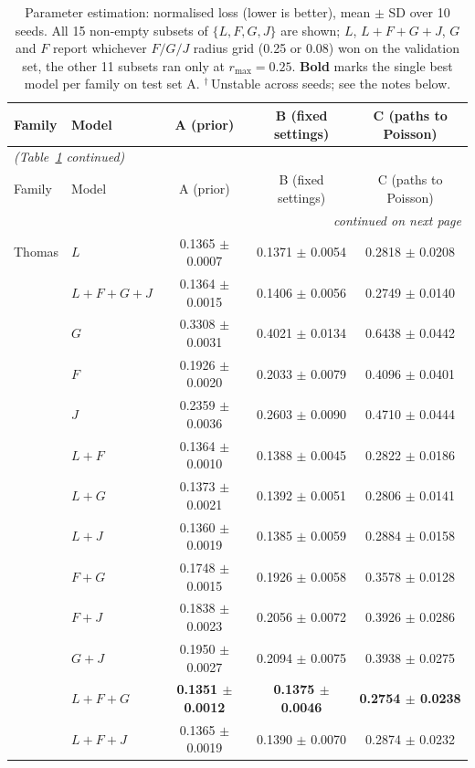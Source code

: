 \documentclass[10pt,a4paper]{article}
\newcommand{\B}[1]{\textbf{#1}}
\begin{document}
\begin{longtable}{@{}ll ccc@{}}
\caption{Parameter estimation: normalised loss (lower is better), mean $\pm$ SD over 10 seeds. All 15 non-empty subsets of $\{L,F,G,J\}$ are shown; $L$, $L{+}F{+}G{+}J$, $G$ and $F$ report whichever $F/G/J$ radius grid (0.25 or 0.08) won on the validation set, the other 11 subsets ran only at $r_{\max}=0.25$. \textbf{Bold} marks the single best model per family on test set A. $^\dagger$\,Unstable across seeds; see the notes below.}
\label{tab:params}\\
\toprule
Family & Model & A (prior) & B (fixed settings) & C (paths to Poisson)\\
\midrule
\endfirsthead
\multicolumn{5}{l}{\small\slshape (Table~\ref{tab:params} continued)}\\
\toprule
Family & Model & A (prior) & B (fixed settings) & C (paths to Poisson)\\
\midrule
\endhead
\midrule
\multicolumn{5}{r}{\small\slshape continued on next page}\\
\endfoot
\bottomrule
\endlastfoot
Thomas & $L$ & 0.1365 $\pm$ 0.0007 & 0.1371 $\pm$ 0.0054 & 0.2818 $\pm$ 0.0208\\
 & $L{+}F{+}G{+}J$ & 0.1364 $\pm$ 0.0015 & 0.1406 $\pm$ 0.0056 & 0.2749 $\pm$ 0.0140\\
 & $G$ & 0.3308 $\pm$ 0.0031 & 0.4021 $\pm$ 0.0134 & 0.6438 $\pm$ 0.0442\\
 & $F$ & 0.1926 $\pm$ 0.0020 & 0.2033 $\pm$ 0.0079 & 0.4096 $\pm$ 0.0401\\
 & $J$ & 0.2359 $\pm$ 0.0036 & 0.2603 $\pm$ 0.0090 & 0.4710 $\pm$ 0.0444\\
 & $L{+}F$ & 0.1364 $\pm$ 0.0010 & 0.1388 $\pm$ 0.0045 & 0.2822 $\pm$ 0.0186\\
 & $L{+}G$ & 0.1373 $\pm$ 0.0021 & 0.1392 $\pm$ 0.0051 & 0.2806 $\pm$ 0.0141\\
 & $L{+}J$ & 0.1360 $\pm$ 0.0019 & 0.1385 $\pm$ 0.0059 & 0.2884 $\pm$ 0.0158\\
 & $F{+}G$ & 0.1748 $\pm$ 0.0015 & 0.1926 $\pm$ 0.0058 & 0.3578 $\pm$ 0.0128\\
 & $F{+}J$ & 0.1838 $\pm$ 0.0023 & 0.2056 $\pm$ 0.0072 & 0.3926 $\pm$ 0.0286\\
 & $G{+}J$ & 0.1950 $\pm$ 0.0027 & 0.2094 $\pm$ 0.0075 & 0.3938 $\pm$ 0.0275\\
 & \B{$L{+}F{+}G$} & \B{0.1351 $\pm$ 0.0012} & \B{0.1375 $\pm$ 0.0046} & \B{0.2754 $\pm$ 0.0238}\\
 & $L{+}F{+}J$ & 0.1365 $\pm$ 0.0019 & 0.1390 $\pm$ 0.0070 & 0.2874 $\pm$ 0.0232\\

\end{longtable}
\end{document}
